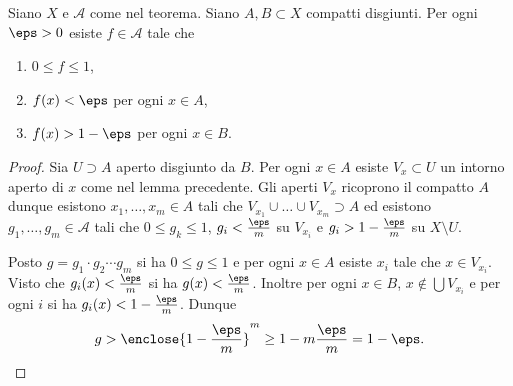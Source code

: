 \begin{lemma}
Siano $X$ e ${\mathcal A}$ come nel teorema.
Siano $A,B\subset X$ compatti disgiunti.
Per ogni $\eps>0$ esiste $f\in {\mathcal A}$ tale che 
\begin{enumerate}
\item    $0 \le f \le 1$,
\item    $f(x) < \eps$ per ogni  $x\in A$,
\item    $f(x) > 1-\eps$ per ogni $x \in B$.
\end{enumerate}
\end{lemma}
%
\begin{proof}
Sia $U\supset A$ aperto disgiunto da $B$.
Per ogni $x\in A$ esiste $V_x\subset U$ 
un intorno aperto di $x$ come nel lemma precedente.
Gli aperti $V_x$ ricoprono il compatto $A$ 
dunque esistono $x_1, \dots, x_m\in A$ tali che 
$V_{x_1} \cup \dots \cup V_{x_m} \supset A$
ed esistono $g_1, \dots, g_m \in {\mathcal A}$ 
tali che $0\le g_k \le 1$, $g_i < \frac \eps m$ su $V_{x_i}$
e $g_i > 1 - \frac \eps m$ su $X\setminus U$.

Posto $g= g_1 \cdot g_2 \cdots g_m$ 
si ha $0\le g \le 1$ e per ogni $x\in A$ 
esiste $x_i$ tale che $x\in V_{x_i}$.
Visto che $g_i(x) < \frac \eps m$ si ha 
$g(x) < \frac \eps m$.
Inoltre per ogni $x\in B$, $x \not \in \bigcup V_{x_i}$
e per ogni $i$ si ha $g_i(x) < 1 - \frac \eps m$.
Dunque 
\[
g > \enclose{1-\frac\eps m}^m \ge 1 - m \frac \eps m = 1-\eps.
\]
\end{proof}

